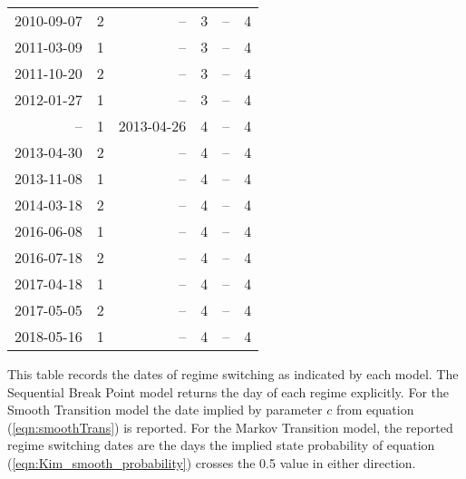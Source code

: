 \begin{table}
\begin{threeparttable}
\begin{tabular}[c]{r r | r r | r r}
			2010-09-07 &  2 &         -- &  3 &         -- &  4 \\
			2011-03-09 &  1 &         -- &  3 &         -- &  4 \\
			2011-10-20 &  2 &         -- &  3 &         -- &  4 \\
			2012-01-27 &  1 &         -- &  3 &         -- &  4 \\
					-- &  1 & 2013-04-26 &  4 &         -- &  4 \\
			2013-04-30 &  2 &         -- &  4 &         -- &  4 \\
			2013-11-08 &  1 &         -- &  4 &         -- &  4 \\
			2014-03-18 &  2 &         -- &  4 &         -- &  4 \\
			2016-06-08 &  1 &         -- &  4 &         -- &  4 \\
			2016-07-18 &  2 &         -- &  4 &         -- &  4 \\
			2017-04-18 &  1 &         -- &  4 &         -- &  4 \\
			2017-05-05 &  2 &         -- &  4 &         -- &  4 \\
			2018-05-16 &  1 &         -- &  4 &         -- &  4 \\
			\hline
		\end{tabular}
		\begin{tablenotes}
			\item{\footnotesize This table records the dates of regime switching as indicated by each model. The Sequential Break Point model returns the day of each regime explicitly. For the Smooth Transition model the date implied by parameter $c$ from equation (\ref{eqn:smoothTrans}) is reported. For the Markov Transition model, the reported regime switching dates are the days the implied state probability of equation (\ref{eqn:Kim_smooth_probability}) crosses the 0.5 value in either direction.}
		\end{tablenotes}
	\end{threeparttable}
\end{table}


